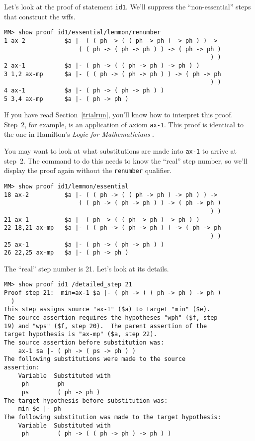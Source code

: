 Let's look at the proof of statement \texttt{id1}.  We'll suppress the
``non-essential'' steps that construct the wffs.

\begin{verbatim}
MM> show proof id1/essential/lemmon/renumber
1 ax-2           $a |- ( ( ph -> ( ( ph -> ph ) -> ph ) ) ->
                     ( ( ph -> ( ph -> ph ) ) -> ( ph -> ph )
                                                          ) )
2 ax-1           $a |- ( ph -> ( ( ph -> ph ) -> ph ) )
3 1,2 ax-mp      $a |- ( ( ph -> ( ph -> ph ) ) -> ( ph -> ph
                                                          ) )
4 ax-1           $a |- ( ph -> ( ph -> ph ) )
5 3,4 ax-mp      $a |- ( ph -> ph )
\end{verbatim}

If you have read Section~\ref{trialrun}, you'll know how to interpret this
proof.  Step~2, for example, is an application of axiom \texttt{ax-1}.  This
proof is identical to the one in Hamilton's {\em Logic for Mathematicians}
\cite[p.~32]{Hamilton}.

You may want to look at what
substitutions are
made into \texttt{ax-1} to arrive at step~2.  The command to do this needs to
know the ``real'' step number, so we'll display the proof again without
the \texttt{renumber} qualifier.

\begin{verbatim}
MM> show proof id1/lemmon/essential
18 ax-2          $a |- ( ( ph -> ( ( ph -> ph ) -> ph ) ) ->
                     ( ( ph -> ( ph -> ph ) ) -> ( ph -> ph )
                                                          ) )
21 ax-1          $a |- ( ph -> ( ( ph -> ph ) -> ph ) )
22 18,21 ax-mp   $a |- ( ( ph -> ( ph -> ph ) ) -> ( ph -> ph
                                                          ) )
25 ax-1          $a |- ( ph -> ( ph -> ph ) )
26 22,25 ax-mp   $a |- ( ph -> ph )
\end{verbatim}

The ``real'' step number is 21.  Let's look at its details.

\begin{verbatim}
MM> show proof id1 /detailed_step 21
Proof step 21:  min=ax-1 $a |- ( ph -> ( ( ph -> ph ) -> ph )
  )
This step assigns source "ax-1" ($a) to target "min" ($e).
The source assertion requires the hypotheses "wph" ($f, step
19) and "wps" ($f, step 20).  The parent assertion of the
target hypothesis is "ax-mp" ($a, step 22).
The source assertion before substitution was:
    ax-1 $a |- ( ph -> ( ps -> ph ) )
The following substitutions were made to the source
assertion:
    Variable  Substituted with
     ph        ph
     ps        ( ph -> ph )
The target hypothesis before substitution was:
    min $e |- ph
The following substitution was made to the target hypothesis:
    Variable  Substituted with
     ph        ( ph -> ( ( ph -> ph ) -> ph ) )
\end{verbatim}

